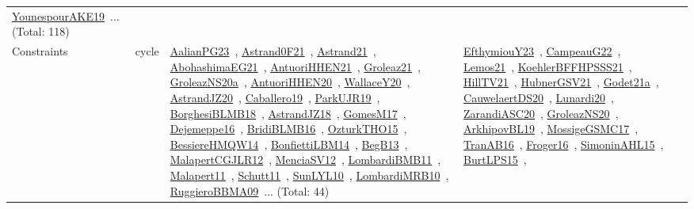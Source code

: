 {\begin{longtable}{lp{3cm}>{\raggedright\arraybackslash}p{6cm}>{\raggedright\arraybackslash}p{6cm}>{\raggedright\arraybackslash}p{8cm}}
\href{../works/YounespourAKE19.pdf}{YounespourAKE19}~\cite{YounespourAKE19}... (Total: 118)\\
Constraints & cycle & \href{../works/AalianPG23.pdf}{AalianPG23}~\cite{AalianPG23}, \href{../works/Astrand0F21.pdf}{Astrand0F21}~\cite{Astrand0F21}, \href{../works/Astrand21.pdf}{Astrand21}~\cite{Astrand21}, \href{../works/AbohashimaEG21.pdf}{AbohashimaEG21}~\cite{AbohashimaEG21}, \href{../works/AntuoriHHEN21.pdf}{AntuoriHHEN21}~\cite{AntuoriHHEN21}, \href{../works/Groleaz21.pdf}{Groleaz21}~\cite{Groleaz21}, \href{../works/GroleazNS20a.pdf}{GroleazNS20a}~\cite{GroleazNS20a}, \href{../works/AntuoriHHEN20.pdf}{AntuoriHHEN20}~\cite{AntuoriHHEN20}, \href{../works/WallaceY20.pdf}{WallaceY20}~\cite{WallaceY20}, \href{../works/AstrandJZ20.pdf}{AstrandJZ20}~\cite{AstrandJZ20}, \href{../works/Caballero19.pdf}{Caballero19}~\cite{Caballero19}, \href{../works/ParkUJR19.pdf}{ParkUJR19}~\cite{ParkUJR19}, \href{../works/BorghesiBLMB18.pdf}{BorghesiBLMB18}~\cite{BorghesiBLMB18}, \href{../works/AstrandJZ18.pdf}{AstrandJZ18}~\cite{AstrandJZ18}, \href{../works/GomesM17.pdf}{GomesM17}~\cite{GomesM17}, \href{../works/Dejemeppe16.pdf}{Dejemeppe16}~\cite{Dejemeppe16}, \href{../works/BridiBLMB16.pdf}{BridiBLMB16}~\cite{BridiBLMB16}, \href{../works/OzturkTHO15.pdf}{OzturkTHO15}~\cite{OzturkTHO15}, \href{../works/BessiereHMQW14.pdf}{BessiereHMQW14}~\cite{BessiereHMQW14}, \href{../works/BonfiettiLBM14.pdf}{BonfiettiLBM14}~\cite{BonfiettiLBM14}, \href{../works/BegB13.pdf}{BegB13}~\cite{BegB13}, \href{../works/MalapertCGJLR12.pdf}{MalapertCGJLR12}~\cite{MalapertCGJLR12}, \href{../works/MenciaSV12.pdf}{MenciaSV12}~\cite{MenciaSV12}, \href{../works/LombardiBMB11.pdf}{LombardiBMB11}~\cite{LombardiBMB11}, \href{../works/Malapert11.pdf}{Malapert11}~\cite{Malapert11}, \href{../works/Schutt11.pdf}{Schutt11}~\cite{Schutt11}, \href{../works/SunLYL10.pdf}{SunLYL10}~\cite{SunLYL10}, \href{../works/LombardiMRB10.pdf}{LombardiMRB10}~\cite{LombardiMRB10}, \href{../works/RuggieroBBMA09.pdf}{RuggieroBBMA09}~\cite{RuggieroBBMA09}... (Total: 44) & \href{../works/EfthymiouY23.pdf}{EfthymiouY23}~\cite{EfthymiouY23}, \href{../works/CampeauG22.pdf}{CampeauG22}~\cite{CampeauG22}, \href{../works/Lemos21.pdf}{Lemos21}~\cite{Lemos21}, \href{../works/KoehlerBFFHPSSS21.pdf}{KoehlerBFFHPSSS21}~\cite{KoehlerBFFHPSSS21}, \href{../works/HillTV21.pdf}{HillTV21}~\cite{HillTV21}, \href{../works/HubnerGSV21.pdf}{HubnerGSV21}~\cite{HubnerGSV21}, \href{../works/Godet21a.pdf}{Godet21a}~\cite{Godet21a}, \href{../works/CauwelaertDS20.pdf}{CauwelaertDS20}~\cite{CauwelaertDS20}, \href{../works/Lunardi20.pdf}{Lunardi20}~\cite{Lunardi20}, \href{../works/ZarandiASC20.pdf}{ZarandiASC20}~\cite{ZarandiASC20}, \href{../works/GroleazNS20.pdf}{GroleazNS20}~\cite{GroleazNS20}, \href{../works/ArkhipovBL19.pdf}{ArkhipovBL19}~\cite{ArkhipovBL19}, \href{../works/MossigeGSMC17.pdf}{MossigeGSMC17}~\cite{MossigeGSMC17}, \href{../works/TranAB16.pdf}{TranAB16}~\cite{TranAB16}, \href{../works/Froger16.pdf}{Froger16}~\cite{Froger16}, \href{../works/SimoninAHL15.pdf}{SimoninAHL15}~\cite{SimoninAHL15}, \href{../works/BurtLPS15.pdf}{BurtLPS15}~\cite{BurtLPS15}, 
\end{longtable}}
